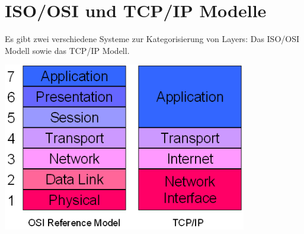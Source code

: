 \section{ISO/OSI und TCP/IP Modelle}

Es gibt zwei verschiedene Systeme zur Kategorisierung von Layers: Das ISO/OSI
Modell sowie das TCP/IP Modell.

\begin{center}
	\includegraphics[width=0.8\textwidth]{media/osi_vs_ip.png}
\end{center}
